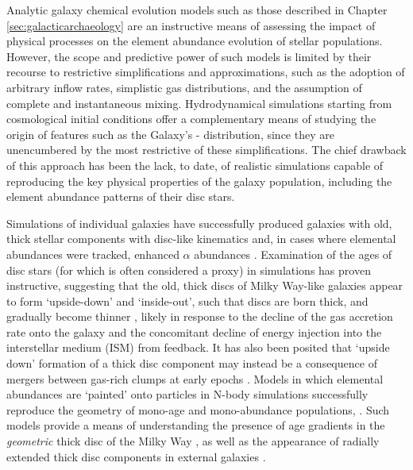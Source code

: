 Analytic galaxy chemical evolution models such as those described in Chapter \ref{sec:galacticarchaeology} are an instructive means of assessing the impact of physical processes on the element abundance evolution of stellar populations. However, the scope and predictive power of such models is limited by their recourse to restrictive simplifications and approximations, such as the adoption of arbitrary inflow rates, simplistic gas distributions, and the assumption of complete and instantaneous mixing. Hydrodynamical simulations starting from cosmological initial conditions offer a complementary means of studying the origin of features such as the Galaxy's \afe{}-\feh{} distribution, since they are unencumbered by the most restrictive of these simplifications. The chief drawback of this approach has been the lack, to date, of realistic simulations capable of reproducing the key physical properties of the galaxy population, including the element abundance patterns of their disc stars.

Simulations of individual galaxies have successfully produced galaxies with old, thick stellar components with disc-like kinematics and, in cases where elemental abundances were tracked, enhanced $\alpha$ abundances \citep[e.g][]{2004ApJ...612..894B,2012MNRAS.426..690B,2013MNRAS.436..625S,2014MNRAS.442.2474M,2014MNRAS.443.2452M}. Examination of the ages of disc stars (for which \afe{} is often considered a proxy) in simulations has proven instructive, suggesting that the old, thick discs of Milky Way-like galaxies appear to form `upside-down' and `inside-out', such that discs are born thick, and gradually become thinner \citep[e.g][]{2006ApJ...639..126B,2013ApJ...773...43B,2016arXiv160804133M,2017arXiv170901040N}, likely in response to the decline of the gas accretion rate onto the galaxy and the concomitant decline of energy injection into the interstellar medium (ISM) from feedback. It has also been posited that `upside down' formation of a thick disc component may instead be a consequence of mergers between gas-rich clumps at early epochs \citep[e.g.][]{1998Natur.392..253N,2004ApJ...612..894B,2009ApJ...707L...1B}. Models in which elemental abundances are `painted' onto particles in N-body simulations successfully reproduce the geometry of mono-age and mono-abundance populations,  \citep[e.g.][]{2013A&A...558A...9M,2015ApJ...804L...9M,2017ApJ...834...27M}.  Such models provide a means of understanding the presence of age gradients in the \emph{geometric} thick disc of the Milky Way \citep[e.g.][]{2016arXiv160901168M,2017arXiv170600018M}, as well as the appearance of radially extended thick disc components in external galaxies \citep[e.g.][]{2006AJ....131..226Y}. 

